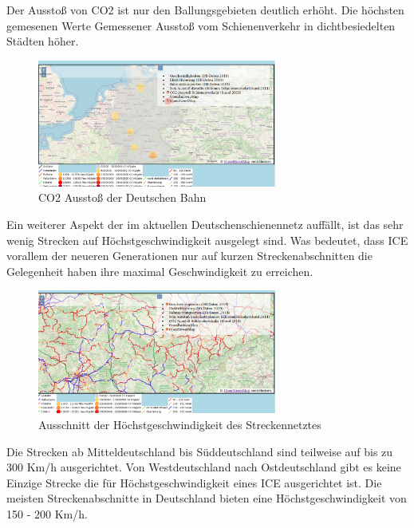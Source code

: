 Der Ausstoß von CO2 ist nur den Ballungsgebieten deutlich erhöht. Die höchsten gemesenen Werte Gemessener Ausstoß vom Schienenverkehr in dichtbesiedelten Städten höher.
\begin{figure}[h]
\centering
	\includegraphics[width=0.7\textwidth]{images/Analyse3.png}
	\caption{CO2 Ausstoß der Deutschen Bahn}
\end{figure}


Ein weiterer Aspekt der im aktuellen Deutschenschienennetz auffällt, ist das sehr wenig Strecken auf Höchstgeschwindigkeit ausgelegt sind. Was bedeutet, dass ICE vorallem der neueren Generationen nur auf kurzen Streckenabschnitten die Gelegenheit haben ihre maximal Geschwindigkeit zu erreichen.

\begin{figure}[h]
\centering
	\includegraphics[width=0.7\textwidth]{images/Analyse2.png}
	\caption{Ausschnitt der Höchstgeschwindigkeit des Streckennetztes}
\end{figure}

Die Strecken ab Mitteldeutschland bis Süddeutschland sind teilweise auf bis zu 300 Km/h ausgerichtet. Von Westdeutschland nach Ostdeutschland gibt es keine Einzige Strecke die für Höchstgeschwindigkeit eines ICE ausgerichtet ist.
Die meisten Streckenabschnitte in Deutschland bieten eine Höchstgeschwindigkeit von 150 - 200 Km/h.
